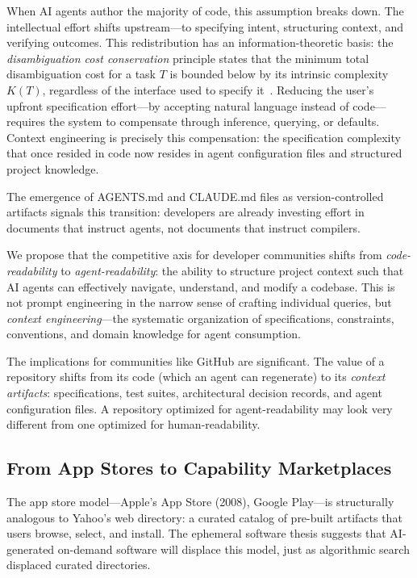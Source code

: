 \documentclass[12pt]{article}
\begin{document}
When AI agents author the majority of code, this assumption breaks down. The intellectual effort shifts upstream---to specifying intent, structuring context, and verifying outcomes. This redistribution has an information-theoretic basis: the \emph{disambiguation cost conservation} principle states that the minimum total disambiguation cost for a task $T$ is bounded below by its intrinsic complexity $K(T)$, regardless of the interface used to specify it~\citep{zgap2026chomsky}. Reducing the user's upfront specification effort---by accepting natural language instead of code---requires the system to compensate through inference, querying, or defaults. Context engineering is precisely this compensation: the specification complexity that once resided in code now resides in agent configuration files and structured project knowledge.

The emergence of AGENTS.md \citep{agentsmd2026impact} and CLAUDE.md files as version-controlled artifacts signals this transition: developers are already investing effort in documents that instruct agents, not documents that instruct compilers.

We propose that the competitive axis for developer communities shifts from \textit{code-readability} to \textit{agent-readability}: the ability to structure project context such that AI agents can effectively navigate, understand, and modify a codebase. This is not prompt engineering in the narrow sense of crafting individual queries, but \textit{context engineering}---the systematic organization of specifications, constraints, conventions, and domain knowledge for agent consumption.

The implications for communities like GitHub are significant. The value of a repository shifts from its code (which an agent can regenerate) to its \textit{context artifacts}: specifications, test suites, architectural decision records, and agent configuration files. A repository optimized for agent-readability may look very different from one optimized for human-readability.

\subsection{From App Stores to Capability Marketplaces}

The app store model---Apple's App Store (2008), Google Play---is structurally analogous to Yahoo's web directory: a curated catalog of pre-built artifacts that users browse, select, and install. The ephemeral software thesis \citep{ellis2025ephemeral, houston2025ephemeral, ali2025ephemeral, harel2025disposable, playbooks2025jit} suggests that AI-generated on-demand software will displace this model, just as algorithmic search displaced curated directories.
\end{document}

